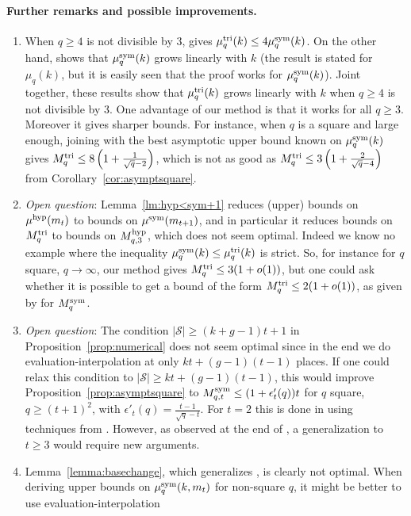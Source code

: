 \documentclass[11pt]{article}
\begin{document}
\paragraph{Further remarks and possible improvements.}
\begin{enumerate}
\item When $q\geq4$ is not divisible by $3$, \cite[Thm.~2]{SL84} gives $\mu^{\textrm{tri}}_q(k)\leq 4\mu^{\textrm{sym}}_q(k)$.
On the other hand, \cite{CC88} shows that $\mu^{\textrm{sym}}_q(k)$ grows linearly with $k$ (the result is stated for $\mu_q(k)$,
but it is easily seen that the proof works for $\mu^{\textrm{sym}}_q(k)$). Joint together, these results show that $\mu^{\textrm{tri}}_q(k)$ grows linearly with $k$
when $q\geq4$ is not divisible by $3$. One advantage of our method is that it works for all $q\geq3$.
Moreover it gives sharper bounds. For instance, when $q$ is a square and large enough, joining \cite[Thm.~2]{SL84} with the best asymptotic upper bound known on $\mu^{\textrm{sym}}_q(k)$ \cite[Thm.~6.4]{Randriam12} gives $M^{\textrm{tri}}_q\leq 8\left(1+\frac{1}{\sqrt{q}-2}\right)$,
which is not as good as $M^{\textrm{tri}}_q\leq 3\left(1+\frac{2}{\sqrt{q}-4}\right)$ from Corollary~\ref{cor:asymptsquare}.
\item \emph{Open question}: Lemma~\ref{lm:hyp<sym+1} reduces (upper) bounds on $\mu^{\textrm{hyp}}(m_t)$ to bounds on $\mu^{\textrm{sym}}(m_{t+1})$,
and in particular it reduces bounds on $M^{\textrm{tri}}_q$ to bounds on $M^{\textrm{hyp}}_{q,3}$, which does not seem optimal.
Indeed we know no example where the inequality $\mu^{\textrm{sym}}_q(k)\leq\mu^{\textrm{tri}}_q(k)$ is strict.
So, for instance for $q$ square, $q\to\infty$, our method gives $M^{\textrm{tri}}_q\leq 3(1+o(1))$,
but one could ask whether it is possible to get a bound of the form $M^{\textrm{tri}}_q\leq 2(1+o(1))$,
as given by \cite[Thm.~6.4]{Randriam12} for $M^{\textrm{sym}}_q$.
\item \emph{Open question}: The condition $|\mathcal{S}|\geq (k+g-1)t+1$ in Proposition~\ref{prop:numerical}
does not seem optimal since in the end we do evaluation-interpolation at only $kt+(g-1)(t-1)$ places.
If one could relax this condition to $|\mathcal{S}|\geq kt+(g-1)(t-1)$, this would improve Proposition~\ref{prop:asymptsquare}
to $M^{\textrm{sym}}_{q,t}\leq(1+\epsilon'_t(q))t$ for $q$ square, $q\geq(t+1)^2$,
with $\epsilon'_t(q)=\frac{t-1}{\sqrt{q}-t}$.
For $t=2$ this is done in \cite{Randriam12,Randriam19} using techniques from \cite{Randriam13}.
However, as observed at the end of \cite{Randriam13}, a generalization to $t\geq3$ would require new arguments.
\item Lemma~\ref{lemma:basechange}, which generalizes \cite[Lemma~1.2]{STV92}, is clearly not optimal.
When deriving upper bounds on $\mu^{\textrm{sym}}_q(k,m_t)$ for non-square $q$, it might be better to use evaluation-interpolation

\end{enumerate}
\end{document}
